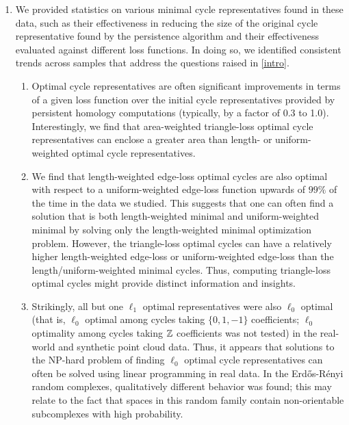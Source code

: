 \begin{enumerate}
    \item We provided statistics on various minimal cycle representatives found in these data, such as their effectiveness in reducing the size of the original cycle representative found by the persistence algorithm and their effectiveness evaluated against different loss functions. In doing so, we identified consistent trends across samples that address the questions raised in \se \ref{intro}.
    \begin{enumerate}
        \item Optimal cycle representatives are often significant improvements in terms of a given loss function over the initial cycle representatives provided by persistent homology computations (typically, by a factor of 0.3 to 1.0). Interestingly, we find that area-weighted triangle-loss optimal cycle representatives can enclose a greater area than length- or uniform-weighted optimal cycle representatives.  
        \item We find that length-weighted edge-loss optimal cycles are also optimal with respect to a uniform-weighted edge-loss function upwards of $99\%$ of the time in the data we studied. This suggests that one can often find a solution that is both length-weighted minimal and uniform-weighted minimal by solving only the length-weighted minimal optimization problem. However, the triangle-loss optimal cycles can have a relatively higher length-weighted edge-loss or uniform-weighted edge-loss than the length/uniform-weighted minimal cycles. Thus, computing triangle-loss optimal cycles might provide distinct information and insights. 
        \item Strikingly, all but one $\ell_1$ optimal representatives were also $\ell_0$ optimal (that is, $\ell_0$ optimal among cycles taking $\{0,1,-1\}$ coefficients;  $\ell_0$ optimality among cycles taking $\mathbb{Z}$ coefficients was not tested) in the real-world and synthetic point cloud data. Thus, it appears that solutions to the NP-hard problem of finding $\ell_0$ optimal cycle representatives can often be solved using linear programming in real data. In the Erd\H{o}s-R\'enyi random complexes, qualitatively different behavior was found; this may relate to the fact that spaces in this random family contain non-orientable subcomplexes with high probability.
    \end{enumerate}


\end{enumerate}
